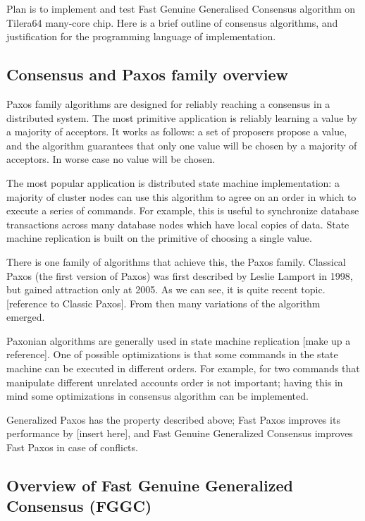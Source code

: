 \documentclass[english,11pt]{article}
\begin{document}
Plan is to implement and test Fast Genuine Generalised Consensus algorithm on
Tilera64 many-core chip. Here is a brief outline of consensus algorithms, and
justification for the programming language of implementation.

\subsection{Consensus and Paxos family overview}

Paxos family algorithms are designed for reliably reaching a consensus in a
distributed system. The most primitive application is reliably learning a value
by a majority of acceptors. It works as follows: a set of proposers propose a
value, and the algorithm guarantees that only one value will be chosen by a
majority of acceptors. In worse case no value will be chosen.

The most popular application is distributed state machine implementation: a
majority of cluster nodes can use this algorithm to agree on an order in which
to execute a series of commands. For example, this is useful to synchronize
database transactions across many database nodes which have local copies of
data. State machine replication is built on the primitive of choosing a single
value.

There is one family of algorithms that achieve this, the Paxos family. Classical
Paxos (the first version of Paxos) was first described by Leslie Lamport in
1998, but gained attraction only at 2005. As we can see, it is quite recent
topic. [reference to Classic Paxos]. From then many variations of the algorithm
emerged.

Paxonian algorithms are generally used in state machine replication [make up a
reference]. One of possible optimizations is that some commands in the state
machine can be executed in different orders. For example, for two commands that
manipulate different unrelated accounts order is not important; having this in
mind some optimizations in consensus algorithm can be implemented.

Generalized Paxos has the property described above; Fast Paxos improves its
performance by [insert here], and Fast Genuine Generalized Consensus improves
Fast Paxos in case of conflicts.

\subsection{Overview of Fast Genuine Generalized Consensus (FGGC)}
\end{document}
